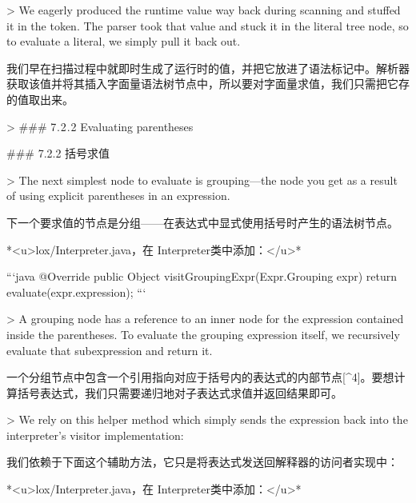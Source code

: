 \documentclass[cn,11pt,chinese]{elegantbook}
\begin{document}
> We eagerly produced the runtime value way back during scanning and stuffed it in the token. The parser took that value and stuck it in the literal tree node, so to evaluate a literal, we simply pull it back out.

我们早在扫描过程中就即时生成了运行时的值，并把它放进了语法标记中。解析器获取该值并将其插入字面量语法树节点中，所以要对字面量求值，我们只需把它存的值取出来。

> ### 7 . 2 . 2 Evaluating parentheses

### 7.2.2 括号求值

> The next simplest node to evaluate is grouping—the node you get as a result of using explicit parentheses in an expression.

下一个要求值的节点是分组——在表达式中显式使用括号时产生的语法树节点。

*<u>lox/Interpreter.java，在 Interpreter类中添加：</u>*

```java
  @Override
  public Object visitGroupingExpr(Expr.Grouping expr) {
    return evaluate(expr.expression);
  }
```

> A grouping node has a reference to an inner node for the expression contained inside the parentheses. To evaluate the grouping expression itself, we recursively evaluate that subexpression and return it.

一个分组节点中包含一个引用指向对应于括号内的表达式的内部节点[^4]。要想计算括号表达式，我们只需要递归地对子表达式求值并返回结果即可。

> We rely on this helper method which simply sends the expression back into the interpreter’s visitor implementation:

我们依赖于下面这个辅助方法，它只是将表达式发送回解释器的访问者实现中：

*<u>lox/Interpreter.java，在 Interpreter类中添加：</u>*
\end{document}
